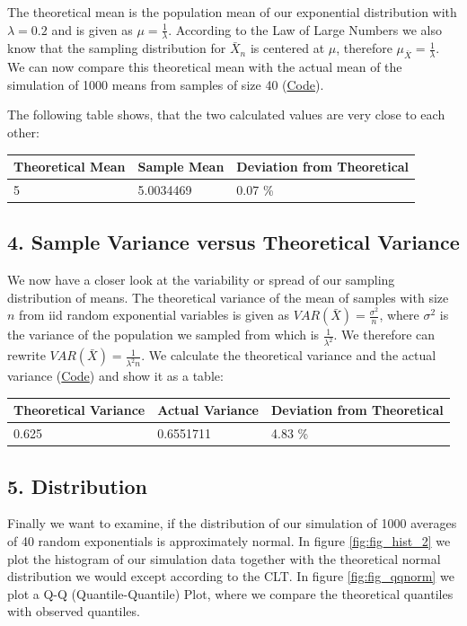 \documentclass[]{article}
\begin{document}
The theoretical mean is the population mean of our exponential
distribution with \(\lambda = 0.2\) and is given as
\(\mu = \frac{1}{\lambda}\). According to the Law of Large Numbers we
also know that the sampling distribution for \(\bar X_n\) is centered at
\(\mu\), therefore \(\mu_{\bar X} = \frac{1}{\lambda}\). We can now
compare this theoretical mean with the actual mean of the simulation of
1000 means from samples of size 40
(\protect\hyperlink{Appendix_1}{Code}).

The following table shows, that the two calculated values are very close
to each other:

\begin{longtable}[]{@{}lll@{}}
\toprule
Theoretical Mean & Sample Mean & Deviation from
Theoretical\tabularnewline
\midrule
\endhead
5 & 5.0034469 & 0.07 \%\tabularnewline
\bottomrule
\end{longtable}

\subsection{4. Sample Variance versus Theoretical
Variance}\label{sample-variance-versus-theoretical-variance}

We now have a closer look at the variability or spread of our sampling
distribution of means. The theoretical variance of the mean of samples
with size \(n\) from iid random exponential variables is given as
\(VAR(\bar X) = \frac{\sigma^2}{n}\), where \(\sigma^2\) is the variance
of the population we sampled from which is \(\frac{1}{\lambda^2}\). We
therefore can rewrite \(VAR(\bar X) = \frac{1}{\lambda^2 n}\). We
calculate the theoretical variance and the actual variance
(\protect\hyperlink{Appendix_4}{Code}) and show it as a table:

\begin{longtable}[]{@{}lll@{}}
\toprule
Theoretical Variance & Actual Variance & Deviation from
Theoretical\tabularnewline
\midrule
\endhead
0.625 & 0.6551711 & 4.83 \%\tabularnewline
\bottomrule
\end{longtable}

\subsection{5. Distribution}\label{distribution}

Finally we want to examine, if the distribution of our simulation of
1000 averages of 40 random exponentials is approximately normal. In
figure \ref{fig:fig_hist_2} we plot the histogram of our simulation data
together with the theoretical normal distribution we would except
according to the CLT. In figure \ref{fig:fig_qqnorm} we plot a Q-Q
(Quantile-Quantile) Plot, where we compare the theoretical quantiles
with observed quantiles.
\end{document}
